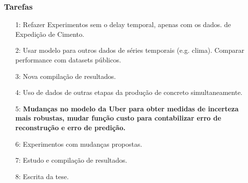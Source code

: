 \documentclass{beamer}
\begin{document}
\begin{frame}
  \frametitle{Tarefas}
\begin{itemize}

\item[1: ] Refazer Experimentos sem o delay temporal, apenas com os dados. 
  de Expedição de Cimento. 
\item[2: ] Usar modelo para outros dados de séries temporais (e.g. clima).
  Comparar performance com datasets públicos. 
\item[3: ] Nova compilação de resultados. 
\item[4: ] Uso de dados de outras etapas da produção de concreto
  simultaneamente.  
\item[5: ] \textbf{Mudanças no modelo da Uber para obter medidas de incerteza mais
  robustas, mudar função custo para contabilizar erro de reconstrução e erro de predição.}
\item[6: ] Experimentos com mudanças propostas. 
\item[7: ] Estudo e compilação de resultados.
\item[8: ] Escrita da tese.


  
\end{itemize}

\end{frame}
\end{document}
